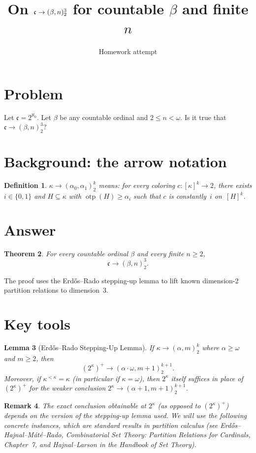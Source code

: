 \documentclass[12pt]{article}
\title{On $\fc\to(\beta,n)^3_2$ for countable $\beta$ and finite $n$}
\author{Homework attempt}
\date{}
\newtheorem{theorem}{Theorem}
\newtheorem{lemma}[theorem]{Lemma}
\newtheorem{definition}[theorem]{Definition}
\newtheorem{remark}[theorem]{Remark}
\newcommand{\fc}{\mathfrak{c}}
\newcommand{\otp}{\operatorname{otp}}
\begin{document}
\maketitle

\section*{Problem}
Let $\fc = 2^{\aleph_0}$. Let $\beta$ be any countable ordinal and $2\le n<\omega$.
Is it true that $\fc\to(\beta,n)^3_2$?

\section*{Background: the arrow notation}

\begin{definition}
$\kappa\to(\alpha_0,\alpha_1)^k_2$ means: for every coloring
$c:[\kappa]^k\to 2$, there exists $i\in\{0,1\}$ and $H\subseteq\kappa$
with $\otp(H)\ge\alpha_i$ such that $c$ is constantly~$i$ on~$[H]^k$.
\end{definition}

\section*{Answer}

\begin{theorem}\label{thm:main}
For every countable ordinal $\beta$ and every finite $n\ge 2$,
\[
  \fc \to (\beta, n)^3_2.
\]
\end{theorem}

The proof uses the Erd\H{o}s--Rado stepping-up lemma to lift known
dimension-2 partition relations to dimension~3.

\section*{Key tools}

\begin{lemma}[Erd\H{o}s--Rado Stepping-Up Lemma]
\label{lem:step}
If $\kappa\to(\alpha,m)^k_2$ where $\alpha\ge\omega$ and $m\ge 2$, then
\[
  (2^\kappa)^+ \to (\alpha\cdot\omega, m+1)^{k+1}_2.
\]
Moreover, if $\kappa^{<\kappa}=\kappa$ (in particular if $\kappa=\omega$),
then $2^\kappa$ itself suffices in place of $(2^\kappa)^+$ for the weaker
conclusion $2^\kappa\to(\alpha+1,m+1)^{k+1}_2$.
\end{lemma}

\begin{remark}
The exact conclusion obtainable at $2^\kappa$ (as opposed to $(2^\kappa)^+$)
depends on the version of the stepping-up lemma used.  We will use the
following concrete instances, which are standard results in partition calculus
(see Erd\H{o}s--Hajnal--M\'at\'e--Rado, \emph{Combinatorial Set Theory:
Partition Relations for Cardinals}, Chapter~7, and Hajnal--Larson in the
\emph{Handbook of Set Theory}).
\end{remark}
\end{document}
